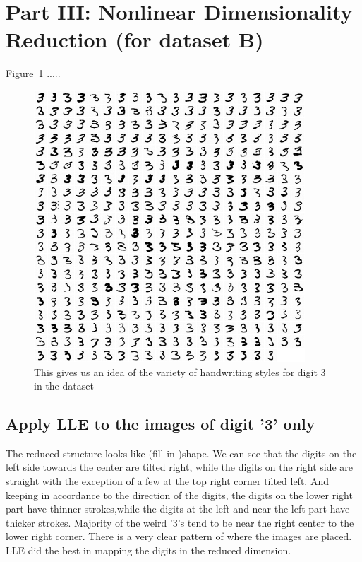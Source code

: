 \section{Part III: Nonlinear Dimensionality Reduction (for dataset B)}

Figure~\ref{fig:fig8} .....
\begin{figure}[htb]
 \centering
\includegraphics[width=4in]{assignment1/3-0-alldigit3.png}
\caption{\label{fig:fig8}This gives us an idea of the variety of handwriting styles for digit 3 in the dataset}
\end{figure}


\clearpage{}
\subsection{Apply LLE to the images of digit '3' only}
 The reduced structure looks like (fill in )shape. We can see that the digits on the left side towards the center are tilted right, while the digits on the right side are straight with the exception of a few at the top right corner tilted left. And keeping in accordance to the direction of the digits, the digits on the lower right part  have thinner strokes,while the digits at the left and  near the left part  have thicker strokes. Majority of the weird '3's  tend to be near the right center to the lower right  corner. There is a very clear pattern of where the images are placed. 
 LLE did the best in mapping the digits in the reduced dimension.


